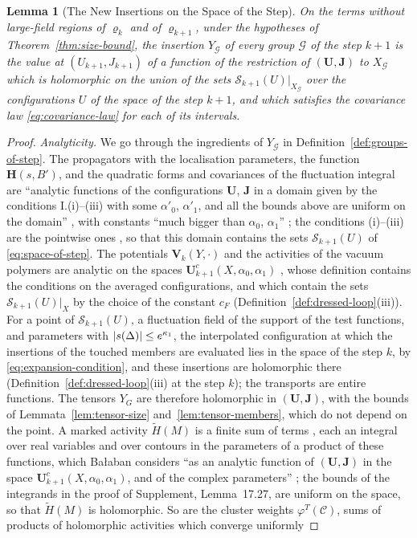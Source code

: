 \documentclass[11pt]{preprint}
\DeclarePairedDelimiter{\abs}{\lvert}{\rvert}
\numberwithin{equation}{section}
\newtheorem{lemma}[theorem]{Lemma}
\theoremstyle{definition}
\theoremstyle{remark}
\theoremstyle{plain}
\begin{document}
\begin{lemma}[The New Insertions on the Space of the Step]\label{lem:new-insertions}
On the terms without large-field regions of $\varrho_k$ and of $\varrho_{k+1}$, under the hypotheses of Theorem~\ref{thm:size-bound}, the insertion $Y_{\mathcal G}$ of every group $\mathcal G$ of the step $k + 1$ is the value at $(U_{k+1}, J_{k+1})$ of a function of the restriction of $(\mathbf U, \mathbf J)$ to $X_{\mathcal G}$ which is holomorphic on the union of the sets $\mathcal S_{k+1}(U)|_{X_{\mathcal G}}$ over the configurations $U$ of the space of the step $k + 1$, and which satisfies the covariance law \eqref{eq:covariance-law} for each of its intervals.
\end{lemma}

\begin{proof}
\emph{Analyticity.} We go through the ingredients of $Y_{\mathcal G}$ in Definition~\ref{def:groups-of-step}. The propagators with the localisation parameters, the function $\mathbf H(s, B')$, and the quadratic forms and covariances of the fluctuation integral are ``analytic functions of the configurations $\mathbf U$, $\mathbf J$ in a domain given by the conditions I.(i)--(iii) with some $\alpha'_0$, $\alpha'_1$, and all the bounds above are uniform on the domain'' \cite[p.~6]{BalabanRG2}, with constants ``much bigger than $\alpha_0$, $\alpha_1$'' \cite[p.~15]{BalabanRG2}; the conditions (i)--(iii) are the pointwise ones \cite[(1.11)--(1.14), p.~262]{BalabanRG1}, so that this domain contains the sets $\mathcal S_{k+1}(U)$ of \eqref{eq:space-of-step}. The potentials $\mathbf V_k(Y, \cdot)$ and the activities of the vacuum polymers are analytic on the spaces $\mathbf U^c_{k+1}(X, \alpha_0, \alpha_1)$ \cite[Lemma~2, p.~11; p.~15]{BalabanRG2}, whose definition contains the conditions on the averaged configurations, and which contain the sets $\mathcal S_{k+1}(U)|_X$ by the choice of the constant $c_F$ (Definition~\ref{def:dressed-loop}(iii)). For a point of $\mathcal S_{k+1}(U)$, a fluctuation field of the support of the test functions, and parameters with $\abs{s(\Delta)} \leq e^{\kappa_1}$, the interpolated configuration at which the insertions of the touched members are evaluated lies in the space of the step $k$, by \eqref{eq:expansion-condition}, and these insertions are holomorphic there (Definition~\ref{def:dressed-loop}(iii) at the step $k$); the transports are entire functions. The tensors $Y_G$ are therefore holomorphic in $(\mathbf U, \mathbf J)$, with the bounds of Lemmata~\ref{lem:tensor-size} and~\ref{lem:tensor-members}, which do not depend on the point. A marked activity $\tilde H(M)$ is a finite sum of terms \cite[(2.14), p.~15]{BalabanRG2}, each an integral over real variables and over contours in the parameters of a product of these functions, which Ba{\l}aban considers ``as an analytic function of $(\mathbf U, \mathbf J)$ in the space $\mathbf U^c_{k+1}(X, \alpha_0, \alpha_1)$, and of the complex parameters'' \cite[p.~15]{BalabanRG2}; the bounds of the integrands in the proof of Supplement, Lemma~17.27, are uniform on the space, so that $\tilde H(M)$ is holomorphic. So are the cluster weights $\varphi^T(\mathcal C)$, sums of products of holomorphic activities which converge uniformly 
\end{proof}
\end{document}
